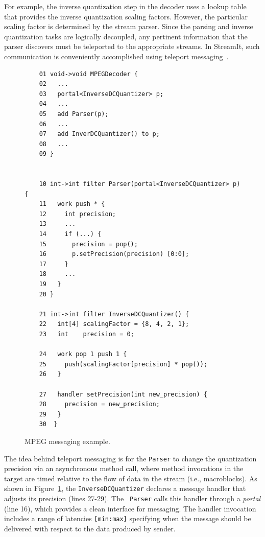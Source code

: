 For example, the inverse quantization step in the decoder uses a
lookup table that provides the inverse quantization scaling factors.
However, the particular scaling factor is determined by the stream
parser. Since the parsing and inverse quantization tasks are logically
decoupled, any pertinent information that the parser discovers must be
teleported to the appropriate streams.  In StreamIt, such
communication is conveniently accomplished using teleport
messaging~\cite{thies05ppopp}.

\begin{figure}[t]
  \begin{scriptsize}
    \begin{verbatim}
	01 void->void MPEGDecoder {
	02   ...
	03   portal<InverseDCQuantizer> p;
	04   ...
	05   add Parser(p);
	06   ...
	07   add InverDCQuantizer() to p;
	08   ...
	09 }
	 
	 
	10 int->int filter Parser(portal<InverseDCQuantizer> p) {
	11   work push * {
	12     int precision;
	13     ...
	14     if (...) {
	15       precision = pop();
	16       p.setPrecision(precision) [0:0];
	17     }
	18     ...
	19   }
	20 }

	21 int->int filter InverseDCQuantizer() {
	22   int[4] scalingFactor = {8, 4, 2, 1};
	23   int    precision = 0;

	24   work pop 1 push 1 {
	25     push(scalingFactor[precision] * pop());
	26   }

	27   handler setPrecision(int new_precision) {
	28     precision = new_precision;
	29   }
	30  }
    \end{verbatim}
  \end{scriptsize}
  \caption{MPEG messaging example.}
  \label{fig:messaging}
\end{figure}

The idea behind teleport messaging is for the {\tt Parser} to change
the quantization precision via an asynchronous method call, where
method invocations in the target are timed relative to the flow of
data in the stream (i.e., macroblocks). As shown in
Figure~\ref{fig:messaging}, the {\tt InverseDCQuantizer} declares a
message handler that adjusts its precision (lines 27-29). The {\tt
Parser} calls this handler through a {\it portal} (line 16), which
provides a clean interface for messaging.  The handler invocation
includes a range of latencies {\tt [min:max]} specifying when the
message should be delivered with respect to the data produced by
sender.


